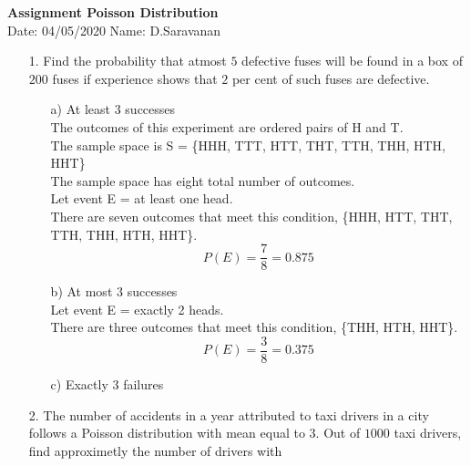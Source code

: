 \documentclass[a4paper,11pt,openright]{report}
\begin{document}
\singlespacing
\pagestyle{plain}

\begin{center}
\textbf{Assignment Poisson Distribution} \\
Date: 04/05/2020 \hspace{2mm} Name: D.Saravanan
\end{center}

\vspace{10px}

\begin{enumerate}

\item[1.] Find the probability that atmost $5$ defective fuses will be found in a box of 
$200$ fuses if experience shows that $2$ per cent of such fuses are defective. \\

\begin{enumerate}

\item[a)] At least $3$ successes \\
The outcomes of this experiment are ordered pairs of H and T. \\
The sample space is S = \{HHH, TTT, HTT, THT, TTH, THH, HTH, HHT\} \\
The sample space has eight total number of outcomes. \\
Let event E =  at least one head. \\
There are seven outcomes that meet this condition, 
 \{HHH, HTT, THT, TTH, THH, HTH, HHT\}.\\
\begin{equation*}
P(E) = \frac{7}{8} = 0.875	
\end{equation*}

\item[b)] At most $3$ successes \\
Let event E = exactly 2 heads. \\
There are three outcomes that meet this condition,
\{THH, HTH, HHT\}. \\
\begin{equation*}
P(E) = \frac{3}{8} = 0.375
\end{equation*}

\item[c)] Exactly $3$ failures \\

\end{enumerate}

\item[2.] The number of accidents in a year attributed to taxi drivers in a city follows a
Poisson distribution with mean equal to $3$. Out of $1000$ taxi drivers, find approximetly
the number of drivers with \\


\end{enumerate}
\end{document}
